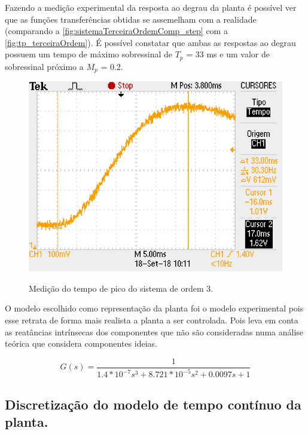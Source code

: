\documentclass[
	article,			%
	11pt,				%
	oneside,			%
	a4paper,			%
	english,			%
	brazil,				%
	sumario=tradicional
	]{abntex2}
\begin{document}
Fazendo a medição experimental da resposta ao degrau da planta é possível ver que as funções transferências obtidas se assemelham com a realidade (comparando a \autoref{fig:sistemaTerceiraOrdemComp_step} com a \autoref{fig:tp_terceiraOrdem}).
É possível constatar que ambas as respostas ao degrau possuem um tempo de máximo sobressinal de $T_p$ = 33 ms e um valor de sobressinal próximo a $M_p$ = 0.2.
\begin{figure}[htb!]
	\centering
	\caption{Medição do tempo de pico do sistema de ordem 3.}
	\includegraphics[scale=1.4]{./img/tp_terceiraOrdem.JPG}
	\label{fig:tp_terceiraOrdem}
\end{figure}

O modelo escolhido como representação da planta foi o modelo experimental pois esse retrata de forma mais realista a planta a ser controlada. Pois leva em conta as reatâncias intrínsecas dos componentes que não são consideradas numa análise teórica que considera componentes ideias.

$$
	G(s) = \frac{1}{1.4*10^{-7} s^3 + 8.721*10^{-5} s^2 + 0.0097 s + 1}
$$

\pagebreak

\subsection{Discretização do modelo de tempo contínuo da planta.}
\end{document}
